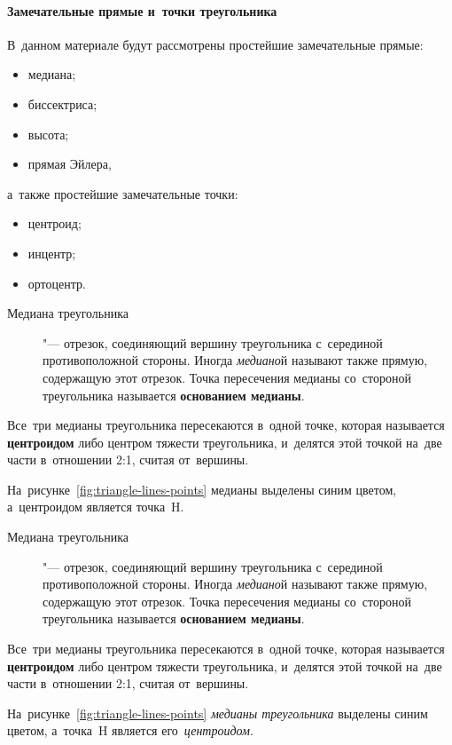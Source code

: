 \documentclass[]{scrartcl}
\begin{document}
\paragraph{Замечательные прямые и~точки треугольника}
В~данном материале будут рассмотрены простейшие замечательные прямые:
\begin{itemize}
	\item медиана;
	\item биссектриса;
	\item высота;
	\item прямая Эйлера,
\end{itemize}
а~также простейшие замечательные точки:
\begin{itemize}
	\item центроид;
	\item инцентр;
	\item ортоцентр.
\end{itemize}

\begin{description}
	\item[Медиана треугольника] "--- отрезок, соединяющий вершину треугольника с~серединой противоположной стороны. Иногда \emph{медиано}й называют также прямую, содержащую этот отрезок. Точка пересечения медианы со~стороной треугольника называется \textbf{основанием медианы}.
\end{description}
Все~три медианы треугольника пересекаются в~одной точке, которая называется \textbf{центроидом} либо центром тяжести треугольника, и~делятся этой точкой на~две части в~отношении 2:1, считая от~вершины.

На~рисунке~\ref{fig:triangle-lines-points} медианы выделены синим цветом, а~центроидом является точка~H.

\begin{description}
	\item[Медиана треугольника] "--- отрезок, соединяющий вершину треугольника с~серединой противоположной стороны. Иногда \emph{медиано}й называют также прямую, содержащую этот отрезок. Точка пересечения медианы со~стороной треугольника называется \textbf{основанием медианы}.
\end{description}
Все~три медианы треугольника пересекаются в~одной точке, которая называется \textbf{центроидом} либо центром тяжести треугольника, и~делятся этой точкой на~две части в~отношении 2:1, считая от~вершины.

На~рисунке~\ref{fig:triangle-lines-points} \emph{медианы треугольника} выделены синим цветом, а~точка~H является его~\emph{центроидом}.
\end{document}
